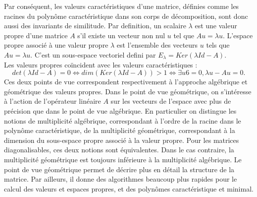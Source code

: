 Par conséquent, les valeurs caractéristiques d’une matrice, définies comme les racines du polynôme caractéristique dans son corps de décomposition, sont donc aussi des invariants de similitude. Par definition, un scalaire $\lambda$ est une valeur propre d’une matrice $A$ s’il existe un vecteur non nul $u$ tel que $Au = \lambda u$. L'espace propre associé à une valeur propre $\lambda$ est l’ensemble des vecteurs $u$ tels que $Au = \lambda u$. C'est un sous-espace vectoriel defini par $E_{\lambda} = Ker(\lambda Id - A)$. \\
Les valeurs propres coïncident avec les valeurs caractéristiques :
\[
 det(\lambda Id - A) = 0 \Leftrightarrow dim(Ker(\lambda Id - A)) > 1 \Leftrightarrow \exists u 6= 0, \lambda u - Au = 0.
\]
Ces deux points de vue correspondent respectivement à l’approche algébrique et géométrique des valeurs propres. Dans le point de vue géométrique, on s’intéresse à l’action de l’opérateur linéaire $A$ sur les vecteurs de l’espace avec plus de précision que dans le point de vue algébrique. En particulier on distingue les notions de
multiplicité algébrique, correspondant à l’ordre de la racine dans le polynôme caractéristique, de la multiplicité géométrique, correspondant à la dimension du sous-espace propre associé à la valeur propre. Pour les matrices diagonalisables, ces deux notions sont équivalentes. Dans le cas contraire, la multiplicité géométrique est toujours inférieure à la multiplicité algébrique. Le point de vue géométrique permet de décrire plus en détail la structure de la matrice. Par ailleurs, il donne des algorithmes beaucoup plus rapides pour le
calcul des valeurs et espaces propres, et des polynômes caractéristique et minimal.
\\
